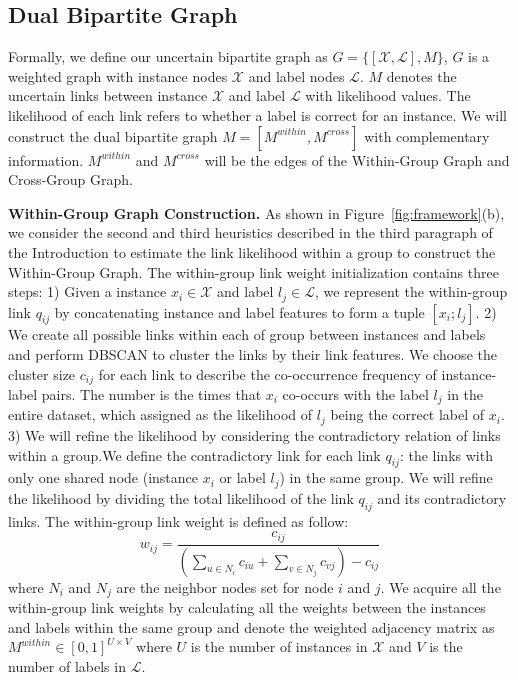 \documentclass[letterpaper]{article} \usepackage{aaai20}  \usepackage{times}  \usepackage{helvet} \usepackage{courier}  \usepackage[hyphens]{url}  \usepackage{graphicx} \urlstyle{rm} \def\UrlFont{\rm}  \frenchspacing  \setlength{\pdfpagewidth}{8.5in}  \setlength{\pdfpageheight}{11in}  \frenchspacing
\begin{document}
\subsection{Dual Bipartite Graph}  \label{sec:subgraphconstruction}
 Formally, we define our uncertain bipartite graph as $G = \{[\mathcal{X}, \mathcal{L}], M\} $, $G$ is a weighted graph with instance nodes $\mathcal{X}$ and label nodes $\mathcal{L}$. 
  $M$ denotes the uncertain links between instance $\mathcal{X}$ and label $\mathcal{L}$ with likelihood values. The likelihood of each link refers to whether a label is correct for an instance. We will construct the dual bipartite graph $M= [M^{within},M^{cross}]$ with complementary information. $M^{within}$ and $M^{cross}$ will be the edges of the Within-Group Graph and Cross-Group Graph.
  
  
\noindent\textbf{Within-Group Graph Construction.} 
As shown in Figure~\ref{fig:framework}(b), we consider the second and third heuristics described in the third paragraph of the Introduction to estimate the link likelihood within a group to construct the Within-Group Graph. 
The within-group link weight initialization contains three steps:
1) Given a instance $x_i \in \mathcal{X}$ and label $l_j \in \mathcal{L}$, we represent the within-group link $q_{ij}$ by concatenating instance and label features to form a tuple $[x_i;l_j]$. 2) We create all possible links within each of group between instances and labels and perform DBSCAN \cite{sander1998density} to 
cluster the links by their link features. We choose the cluster size $c_{ij}$ for each link to describe the co-occurrence frequency of instance-label pairs. 
The number is the times that $x_i$ co-occurs with the label $l_j$ in the entire dataset, which assigned as the likelihood of $l_j$ being the correct label of $x_i$.  3) We will refine the likelihood by considering the contradictory relation of links within a group.We define the contradictory link for each link $q_{ij}$: the links with only one shared node (instance $x_i$ or label $l_{j}$) in the same group. We will refine the likelihood by dividing the total likelihood of the link $q_{ij}$ and its contradictory links. The within-group link weight is defined as follow: 
\begin{equation}
w_{ij} = \frac{c_{ij}}{(\sum_{u\in N_i}c_{iu}+\sum_{v\in N_j}c_{vj})-c_{ij}}
\end{equation}
where $N_i$ and $N_j$ are the neighbor nodes set for node $i$ and $j$. 
We acquire all the within-group link weights by calculating all the weights between the instances and labels within the same group and denote the weighted adjacency matrix as $M^{within}\in [0,1]^{U \times V}$ where $U$ is the number of instances in $\mathcal{X}$ and $V$ is the number of labels in $\mathcal{L}$. 
\end{document}
